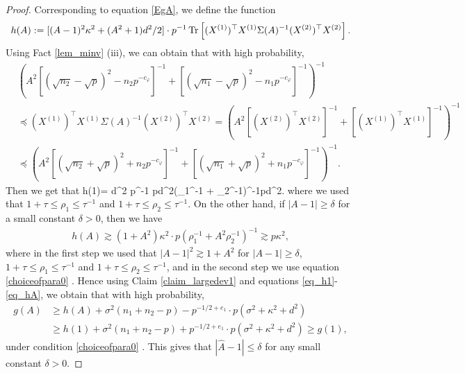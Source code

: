 \begin{proof}
Corresponding to equation \eqref{EgA}, we define the function
\begin{align*}
h(A):= [(A-1)^2\kappa^2 + (A^2+1)d^2/2] \cdot p^{-1} \operatorname{Tr}\left[ (X^{(1)})^\top X^{(1)} \Sigma(A)^{-1}(X^{(2)})^\top X^{(2)}\right].
\end{align*}
Using Fact \ref{lem_minv} (iii), we can obtain that with high probability,
\begin{align} 
&\left( A^2 \left[(\sqrt{n_2}-\sqrt{p})^{2}-n_2p^{-c_\varphi}\right]^{-1} +\left[(\sqrt{n_1}-\sqrt{p})^{2}-n_1p^{-c_\varphi}\right]^{-1} \right)^{-1} \nonumber\\
&\preceq (X^{(1)})^\top X^{(1)} \Sigma(A)^{-1}(X^{(2)})^\top X^{(2)} =\left( A^2 [(X^{(2)})^\top X^{(2)}]^{-1} + [(X^{(1)})^\top X^{(1)}]^{-1} \right)^{-1} \nonumber\\
&\preceq \left( A^2 \left[(\sqrt{n_2}+\sqrt{p})^{2}+n_2p^{-c_\varphi}\right]^{-1} +\left[(\sqrt{n_1}+\sqrt{p})^{2}+n_1p^{-c_\varphi}\right]^{-1} \right)^{-1}. \label{op_uplow}
\end{align}
Then we get that
\be\label{eq_h1}h(1)= d^2 \cdot p^{-1} \tr{}\lesssim pd^2\left(\rho_1^{-1} + \rho_2^{-1}\right)^{-1}\lesssim pd^2.\ee
where we used that $1+\tau\le \rho_1\le \tau^{-1}$ and $1+\tau\le \rho_2\le \tau^{-1}$. On the other hand, if $|A-1|\ge \delta$ for a small constant $\delta>0$, then we have 
\begin{align}\label{eq_hA}
h(A)\gtrsim (1+A^2)\kappa^2 \cdot p\left(\rho_1^{-1} + A^2 \rho_2^{-1}\right)^{-1} \gtrsim p\kappa^2 ,
\end{align}
where in the first step we used that $|A-1|^2\gtrsim 1+A^2$ for $|A-1|\ge \delta$, $1+\tau\le \rho_1\le \tau^{-1}$ and $1+\tau\le \rho_2\le \tau^{-1}$, and in the second step we use equation \eqref{choiceofpara0} . Hence using Claim \ref{claim_largedev1} and equations \eqref{eq_h1}-\eqref{eq_hA}, we obtain that with high probability,
\begin{align}
g(A)&\ge  h(A) +\sigma^2(n_1+n_2-p) -p^{-1/2+e_1}\cdot p\left(\sigma^2 +\kappa^2+d^2 \right) \nonumber\\
&\ge h(1) +\sigma^2(n_1+n_2-p) + p^{-1/2+e_1}\cdot p\left(\sigma^2 +\kappa^2+d^2 \right) \ge g(1), \label{gA>g1}
\end{align}
under condition \eqref{choiceofpara0} .
This gives that
$|\hat A-1|\le \delta$ for any small constant $\delta>0$.





\end{proof}

